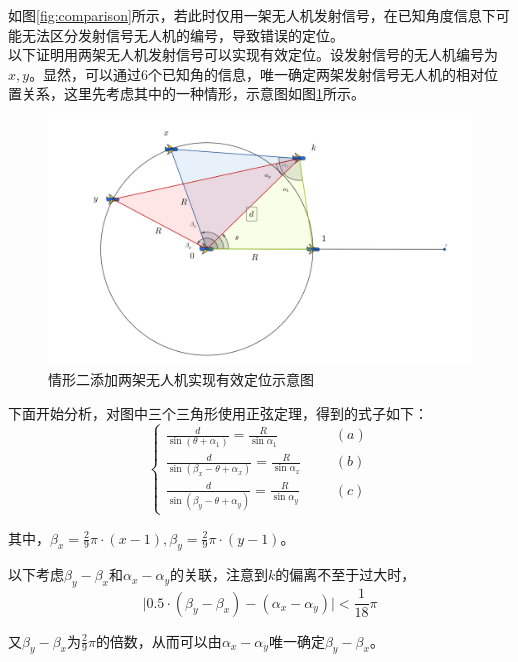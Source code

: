 \documentclass[withoutpreface,bwprint]{cumcmthesis} %
\begin{document}
如图\ref{fig:comparison}所示，若此时仅用一架无人机发射信号，在已知角度信息下可能无法区分发射信号无人机的编号，导致错误的定位。\\

以下证明用两架无人机发射信号可以实现有效定位。设发射信号的无人机编号为$x,y$。显然，可以通过6个已知角的信息，唯一确定两架发射信号无人机的相对位置关系，这里先考虑其中的一种情形，示意图如图\ref{fig:pos2}所示。\\

\begin{figure}[H]
    \centering
    \includegraphics[width=1.0\textwidth]{figures/T2 fig3_.png}
    \caption{情形二添加两架无人机实现有效定位示意图}
    \label{fig:pos2}
\end{figure}


下面开始分析，对图中三个三角形使用正弦定理，得到的式子如下：
\begin{equation}
\left\{\begin{array}{lccr}
\frac{d}{\sin \left(\theta + \alpha_1\right)}=\frac{R}{\sin \alpha_1}  &  &&(a)\\
\frac{d}{\sin \left(\beta_x  - \theta + \alpha_x\right)}=\frac{R}{\sin \alpha_x} & &&(b)\\
\frac{d}{\sin \left(\beta_y  - \theta + \alpha_y\right)}=\frac{R}{\sin \alpha_y} & &&(c)
\end{array}\right.
\label{eq:abc}
\end{equation}

其中，$\beta_x= \frac{2}{9}\pi\cdot(x-1),\beta_y= \frac{2}{9}\pi\cdot(y-1)$。

以下考虑$\beta_y-\beta_x$和$\alpha_x-\alpha_y$的关联，注意到$k$的偏离不至于过大时，
$$\lvert 0.5\cdot(\beta_y-\beta_x)-(\alpha_x-\alpha_y) \rvert<\frac{1}{18}\pi$$

又$\beta_y-\beta_x$为$\frac{2}{9}\pi$的倍数，从而可以由$\alpha_x-\alpha_y$唯一确定$\beta_y-\beta_x$。\\
\end{document}

